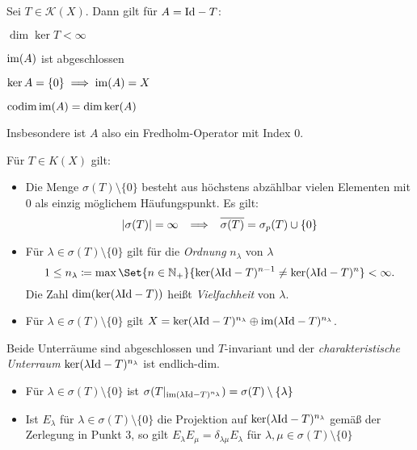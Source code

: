 \documentclass{cheat-sheet}
\newcommand{\codim}{\mathrm{codim}} %
\begin{document}
\begin{satz}
  Sei $T \in \mathcal{K}(X)$. Dann gilt für $A = \mathrm{Id} - T$:
  \begin{itemize}
    \begin{multicols}{2}
      \item $\dim \ker T < \infty$
      \item $\mathop{\mathrm{im}}(A)$ ist abgeschlossen
      \item $\ker A = \{ 0 \} \implies \mathop{\mathrm{im}}(A) = X$
      \item $\codim \im(A) = \dim \ker(A)$
    \end{multicols}
  \end{itemize}
  Insbesondere ist $A$ also ein Fredholm-Operator mit Index $0$.
\end{satz}

\begin{satz}
  Für $T \in K(X)$ gilt:
  \begin{itemize}
    \item Die Menge $\sigma(T) \setminus \{ 0 \}$ besteht aus höchstens abzählbar vielen Elementen mit $0$ als einzig möglichem Häufungspunkt. Es gilt:
    \[
      \lvert\sigma(T)\rvert = \infty
      \enspace \implies \enspace
      \overline{\sigma(T)} = \sigma_p(T) \cup \{ 0 \}
    \]
    \item Für $\lambda \in \sigma(T) \setminus \{ 0 \}$ gilt für die \emph{Ordnung} $n_\lambda$ von $\lambda$
    \[ 1 \leq n_{\lambda} \coloneqq \max \Set{n \in \N_{+}}{ \ker(\lambda \Id - T)^{n-1} \not= \ker(\lambda \Id - T)^n } < \infty. \]
    Die Zahl $\dim (\ker (\lambda \mathrm{Id} - T))$ heißt \emph{Vielfachheit} von $\lambda$.
    \item Für $\lambda \in \sigma(T) \setminus \{ 0 \}$ gilt $X = \ker (\lambda \mathrm{Id} - T)^{n_\lambda} \oplus \mathop{\mathrm{im}} (\lambda \mathrm{Id} - T)^{n_\lambda}$.
  \end{itemize}
  Beide Unterräume sind abgeschlossen und $T$-invariant und der \emph{charakteristische Unterraum} $\ker (\lambda \mathrm{Id} - T)^{n_\lambda}$ ist endlich-dim.
  \begin{itemize}
    \item  Für $\lambda \in \sigma(T) \setminus \{ 0 \}$ ist $\sigma(T|_{\mathop{\mathrm{im}} (\lambda \mathrm{Id} - T)^{n_\lambda}}) = \sigma(T) \setminus \{ \lambda \}$
    \item Ist $E_\lambda$ für $\lambda \in \sigma(T) \setminus \{ 0 \}$ die Projektion auf $\ker (\lambda \mathrm{Id} - T)^{n_\lambda}$ gemäß der Zerlegung in Punkt 3, so gilt $E_\lambda E_\mu = \delta_{\lambda \mu} E_\lambda$ für $\lambda, \mu \in \sigma(T) \setminus \{ 0 \}$
  \end{itemize}
\end{satz}
\end{document}
